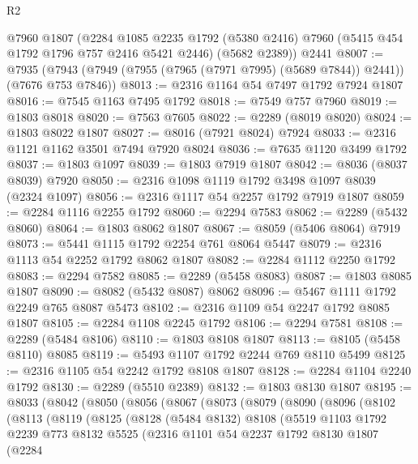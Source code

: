 \begin{lexlean}{R2}
\begin{coremodule}
    @7960
    @1807
    (@2284
      @1085
      @2235
      @1792
      (@5380 @2416)
      @7960
      (@5415 @454 @1792 @1796 @757 @2416 @5421 @2446)
      (@5682 @2389))
    @2441
@8007 := @7935 (@7943 (@7949 (@7955 (@7965 (@7971 @7995) (@5689 @7844)) @2441)) (@7676 @753 @7846))
@8013 := @2316 @1164 @54 @7497 @1792 @7924 @1807
@8016 := @7545 @1163 @7495 @1792
@8018 := @7549 @757 @7960
@8019 := @1803 @8018
@8020 := @7563 @7605
@8022 := @2289 (@8019 @8020)
@8024 := @1803 @8022 @1807
@8027 := @8016 (@7921 @8024) @7924
@8033 := @2316 @1121 @1162 @3501 @7494 @7920 @8024
@8036 := @7635 @1120 @3499 @1792
@8037 := @1803 @1097
@8039 := @1803 @7919 @1807
@8042 := @8036 (@8037 @8039) @7920
@8050 := @2316 @1098 @1119 @1792 @3498 @1097 @8039 (@2324 @1097)
@8056 := @2316 @1117 @54 @2257 @1792 @7919 @1807
@8059 := @2284 @1116 @2255 @1792
@8060 := @2294 @7583
@8062 := @2289 (@5432 @8060)
@8064 := @1803 @8062 @1807
@8067 := @8059 (@5406 @8064) @7919
@8073 := @5441 @1115 @1792 @2254 @761 @8064 @5447
@8079 := @2316 @1113 @54 @2252 @1792 @8062 @1807
@8082 := @2284 @1112 @2250 @1792
@8083 := @2294 @7582
@8085 := @2289 (@5458 @8083)
@8087 := @1803 @8085 @1807
@8090 := @8082 (@5432 @8087) @8062
@8096 := @5467 @1111 @1792 @2249 @765 @8087 @5473
@8102 := @2316 @1109 @54 @2247 @1792 @8085 @1807
@8105 := @2284 @1108 @2245 @1792
@8106 := @2294 @7581
@8108 := @2289 (@5484 @8106)
@8110 := @1803 @8108 @1807
@8113 := @8105 (@5458 @8110) @8085
@8119 := @5493 @1107 @1792 @2244 @769 @8110 @5499
@8125 := @2316 @1105 @54 @2242 @1792 @8108 @1807
@8128 := @2284 @1104 @2240 @1792
@8130 := @2289 (@5510 @2389)
@8132 := @1803 @8130 @1807
@8195 := @8033
    (@8042
      (@8050
        (@8056
          (@8067
            (@8073
              (@8079
                (@8090
                  (@8096
                    (@8102
                      (@8113
                        (@8119
                          (@8125
                            (@8128
                              (@5484 @8132)
                              @8108
                              (@5519
                                @1103
                                @1792
                                @2239
                                @773
                                @8132
                                @5525
                                (@2316
                                  @1101
                                  @54
                                  @2237
                                  @1792
                                  @8130
                                  @1807
                                  (@2284

\end{coremodule}
\end{lexlean}
